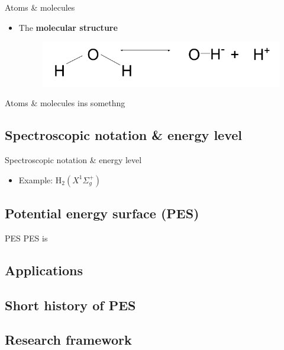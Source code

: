\documentclass{beamer}
\begin{document}
\begin{frame}{Atoms \& molecules}
    \begin{itemize}
        \item The \textbf{molecular structure}
        \begin{figure}[htbp]
            \centering
            \includegraphics[scale=0.3]{img/slide/atoms_molecules.png}
            \label{fig:h2o}
        \end{figure}
    \end{itemize}
\end{frame}

\begin{frame}{Atoms \& molecules}
    ins somethng
\end{frame}

\subsection{Spectroscopic notation \& energy level}
\begin{frame}{Spectroscopic notation \& energy level}
    \begin{itemize}
        \item Example: H$_2(X^1\Sigma_g^+)$
    \end{itemize}
\end{frame}

\subsection{Potential energy surface (PES)}
\begin{frame}{PES}
    PES is
\end{frame}
\subsection{Applications}
\subsection{Short history of PES}
\subsection{Research framework}
\end{document}
